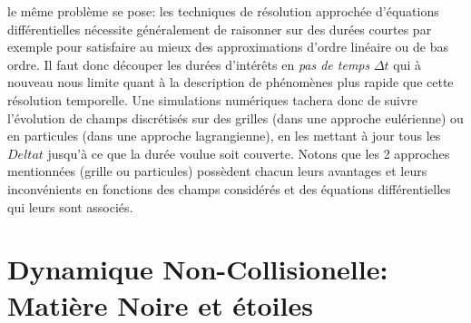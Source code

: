  le même problème se pose: les techniques de résolution approchée d'équations différentielles nécessite généralement de raisonner sur des durées courtes par exemple pour satisfaire au mieux des approximations d'ordre linéaire ou de bas ordre. Il faut donc découper les durées d'intérêts en \textit{pas de temps} $\Delta t$ qui à nouveau nous limite quant à la description de phénomènes plus rapide que cette résolution temporelle. Une simulations numériques tachera donc de suivre l'évolution de champs discrétisés sur des grilles (dans une approche eulérienne) ou en particules (dans une approche lagrangienne), en les mettant à jour tous les $Delta t$ jusqu'à ce que la durée voulue soit couverte. Notons que les 2 approches mentionnées (grille ou particules) possèdent chacun leurs avantages et leurs inconvénients en fonctions des champs considérés et des équations différentielles qui leurs sont associés.


\section{Dynamique Non-Collisionelle: Matière Noire et étoiles}

